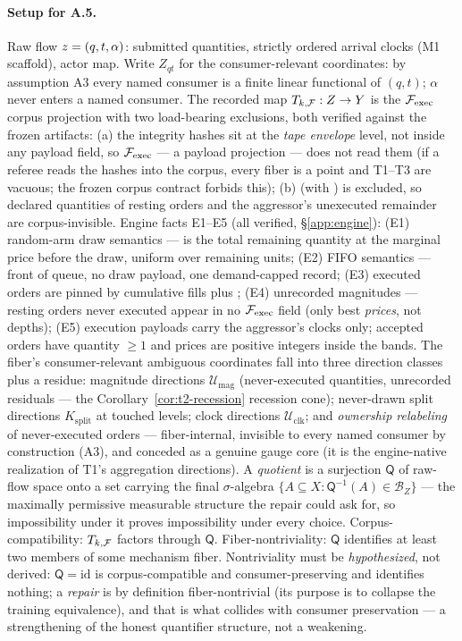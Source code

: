 \paragraph{Setup for A.5.} Raw flow $z = (q, t, \alpha)$: submitted
quantities, strictly ordered arrival clocks (M1 scaffold), actor map. Write
$Z_{qt}$ for the consumer-relevant coordinates: by assumption A3 every
named consumer is a finite linear functional of $(q,t)$; $\alpha$ never
enters a named consumer. The recorded map
$T_{k,\mathcal{F}} : Z \to Y$ is the $\mathcal{F}_{\mathrm{exec}}$ corpus projection with two
load-bearing exclusions, both verified against the frozen artifacts:
(a) the integrity hashes sit at the \emph{tape envelope} level, not inside
any payload field, so $\mathcal{F}_{\mathrm{exec}}$ --- a payload projection --- does not read
them (if a referee reads the hashes into the corpus, every fiber is a point
and T1--T3 are vacuous; the frozen corpus contract forbids this);
(b)  (with ) is excluded, so
declared quantities of resting orders and the aggressor's unexecuted
remainder are corpus-invisible. Engine facts E1--E5 (all verified,
\S\ref{app:engine}): (E1) random-arm draw semantics ---
 is the total remaining quantity at the marginal price
before the draw,  uniform over remaining units;
(E2) FIFO semantics --- front of queue, no draw payload, one demand-capped
record; (E3) executed orders are pinned by cumulative fills plus
; (E4) unrecorded magnitudes --- resting orders never
executed appear in no $\mathcal{F}_{\mathrm{exec}}$ field (only best \emph{prices}, not depths);
(E5) execution payloads carry the aggressor's clocks only; accepted orders
have quantity $\ge 1$ and prices are positive integers inside the bands.
The fiber's consumer-relevant ambiguous coordinates fall into three
direction classes plus a residue: magnitude directions $\mathcal{U}_{\mathrm{mag}}$ (never-executed
quantities, unrecorded residuals --- the
Corollary~\ref{cor:t2-recession} recession cone); never-drawn split
directions $K_{\mathrm{split}}$ at touched levels; clock directions $\mathcal{U}_{\mathrm{clk}}$; and
\emph{ownership relabeling} of never-executed orders --- fiber-internal,
invisible to every named consumer by construction (A3), and conceded as a
genuine gauge core (it is the engine-native realization of T1's aggregation
directions). A \emph{quotient} is a surjection $\mathsf{Q}$ of raw-flow
space onto
a set carrying the final $\sigma$-algebra
$\{A \subseteq X : \mathsf{Q}^{-1}(A) \in \mathcal{B}_Z\}$ --- the maximally
permissive measurable structure the repair could ask for, so impossibility
under it proves impossibility under every choice. Corpus-compatibility:
$T_{k,\mathcal{F}}$ factors through $\mathsf{Q}$. Fiber-nontriviality:
$\mathsf{Q}$ identifies at
least two members of some mechanism fiber. Nontriviality must be
\emph{hypothesized}, not derived: $\mathsf{Q} = \mathrm{id}$ is corpus-compatible
and consumer-preserving and identifies nothing; a \emph{repair} is by
definition fiber-nontrivial (its purpose is to collapse the training
equivalence), and that is what collides with consumer preservation --- a
strengthening of the honest quantifier structure, not a weakening.


